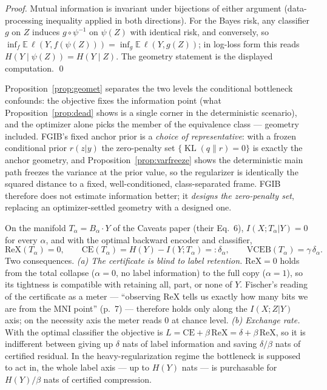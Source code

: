 \begin{proof}
Mutual information is invariant under bijections of either argument (data-processing
inequality applied in both directions). For the Bayes risk, any classifier $g$ on $Z$
induces $g \circ \psi^{-1}$ on $\psi(Z)$ with identical risk, and conversely, so
$\inf_f \mathbb{E}\,\ell(Y, f(\psi(Z))) = \inf_g \mathbb{E}\,\ell(Y, g(Z))$; in
log-loss form this reads $H(Y \mid \psi(Z)) = H(Y \mid Z)$. The geometry statement is
the displayed computation.
\hfill\qed
\end{proof}

\begin{remark}\label{rem:design}
Proposition~\ref{prop:geomet} separates the two levels the conditional bottleneck
confounds: the objective fixes the information point (what Proposition~\ref{prop:dead}
shows is a single corner in the deterministic scenario), and the optimizer alone picks
the member of the equivalence class --- geometry included. FGIB's fixed anchor prior is
a \emph{choice of representative}: with a frozen conditional prior $r(z|y)$ the
zero-penalty set $\{\operatorname{KL}(q\|r) = 0\}$ is exactly the anchor geometry, and
Proposition~\ref{prop:varfreeze} shows the deterministic main path freezes the variance
at the prior value, so the regularizer is identically the squared distance to a fixed,
well-conditioned, class-separated frame. FGIB therefore does not estimate information
better; it \emph{designs the zero-penalty set}, replacing an optimizer-settled geometry
with a designed one.
\end{remark}

\begin{proposition}\label{prop:flat}
On the manifold $T_\alpha = B_\alpha \cdot Y$ of the Caveats paper (their Eq.~6),
$I(X;T_\alpha|Y) = 0$ for every $\alpha$, and with the optimal backward encoder and
classifier,
\begin{equation}
\mathrm{ReX}(T_\alpha) = 0,
\qquad
\mathrm{CE}(T_\alpha) = H(Y) - I(Y;T_\alpha) =: \delta_\alpha,
\qquad
\mathrm{VCEB}(T_\alpha) = \gamma\,\delta_\alpha .
\label{eq:vceb}
\end{equation}
Two consequences.
\emph{(a) The certificate is blind to label retention.} $\mathrm{ReX} = 0$ holds from the
total collapse ($\alpha = 0$, no label information) to the full copy ($\alpha = 1$), so its
tightness is compatible with retaining all, part, or none of $Y$. Fischer's reading of the
certificate as a meter --- ``observing ReX tells us exactly how many bits we are from the
MNI point'' (p.~7) --- therefore holds only along the $I(X;Z|Y)$ axis; on the necessity axis
the meter reads $0$ at chance level.
\emph{(b) Exchange rate.} With the optimal classifier the objective is
$L = \mathrm{CE} + \beta\,\mathrm{ReX} = \delta + \beta\,\mathrm{ReX}$, so it is indifferent
between giving up $\delta$ nats of label information and saving $\delta/\beta$ nats of
certified residual. In the heavy-regularization regime the bottleneck is supposed to act in,
the whole label axis --- up to $H(Y)$ nats --- is purchasable for $H(Y)/\beta$ nats of
certified compression.
\end{proposition}

